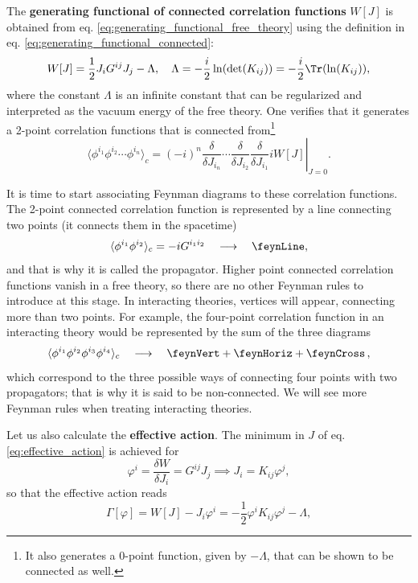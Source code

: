 The \textbf{generating functional of connected correlation functions} \(W[J]\) is obtained from eq. \eqref{eq:generating_functional_free_theory} using the definition in eq. \eqref{eq:generating_functional_connected}:
\[
    W[J] = \frac{1}{2} J_i G^{ij} J_j - \Lambda, \quad \Lambda = -\frac{i}{2} \ln(\det(K_{ij})) = -\frac{i}{2}\Tr (\ln(K_{ij})),
\]
where the constant \(\Lambda\) is an infinite constant that can be regularized and interpreted as the vacuum energy of the free theory. One verifies that it generates a 2-point correlation functions that is connected from\footnote{It also generates a 0-point function, given by \(-\Lambda\), that can be shown to be connected as well.}
\[
    \langle \phi^{i_1} \phi^{i_2} \cdots \phi^{i_n} \rangle_c = \left. \left(-i\right)^n \frac{\delta}{\delta J_{i_n}} \cdots \frac{\delta}{\delta J_{i_2}} \frac{\delta}{\delta J_{i_1}} i W[J] \right|_{J=0}.
\]

It is time to start associating Feynman diagrams to these correlation functions. The 2-point connected correlation function is represented by a line connecting two points (it connects them in the spacetime)
\[
    \langle \phi^{i_1} \phi^{i_2} \rangle_c = -i G^{i_1 i_2} \quad \longrightarrow \quad \feynLine,
\]
and that is why it is called the propagator. Higher point connected correlation functions vanish in a free theory, so there are no other Feynman rules to introduce at this stage. In interacting theories, vertices will appear, connecting more than two points. For example, the four-point correlation function in an interacting theory would be represented by the sum of the three diagrams
\[
    \langle \phi^{i_1} \phi^{i_2} \phi^{i_3} \phi^{i_4} \rangle_c \quad \longrightarrow \quad \feynVert + \feynHoriz + \feynCross \, ,
\]
which correspond to the three possible ways of connecting four points with two propagators; that is why it is said to be non-connected. We will see more Feynman rules when treating interacting theories.

Let us also calculate the \textbf{effective action}. The minimum in \(J\) of eq. \eqref{eq:effective_action} is achieved for
\[
    \varphi^i = \frac{\delta W}{\delta J_i} = G^{ij} J_j \implies J_i = K_{ij} \varphi^j,
\]
so that the effective action reads
\begin{equation}
    \Gamma[\varphi] = W[J] - J_i \varphi^i = -\frac{1}{2} \varphi^i K_{ij} \varphi^j - \Lambda,
    \label{eq:effective_action_free_theory}
\end{equation}

